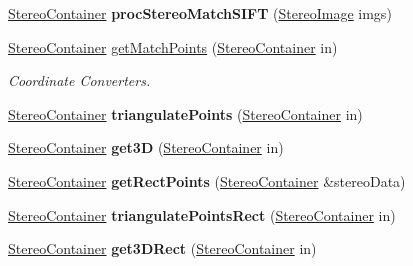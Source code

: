 \begin{DoxyCompactItemize}
\item 
\hyperlink{structStereoContainer}{Stereo\+Container} {\bfseries proc\+Stereo\+Match\+S\+I\+FT} (\hyperlink{classStereoImage}{Stereo\+Image} imgs)\hypertarget{classStereoOps_aaf97002741bcdffbe6514003314cc1ac}{}\label{classStereoOps_aaf97002741bcdffbe6514003314cc1ac}

\item 
\hyperlink{structStereoContainer}{Stereo\+Container} \hyperlink{classStereoOps_acf8969704960f88a3d67bdbe4382041b}{get\+Match\+Points} (\hyperlink{structStereoContainer}{Stereo\+Container} in)\hypertarget{classStereoOps_acf8969704960f88a3d67bdbe4382041b}{}\label{classStereoOps_acf8969704960f88a3d67bdbe4382041b}

\begin{DoxyCompactList}\small\item\em Coordinate Converters. \end{DoxyCompactList}\item 
\hyperlink{structStereoContainer}{Stereo\+Container} {\bfseries triangulate\+Points} (\hyperlink{structStereoContainer}{Stereo\+Container} in)\hypertarget{classStereoOps_a3d039bd6b9a1415a6a7604a5de4f4a8f}{}\label{classStereoOps_a3d039bd6b9a1415a6a7604a5de4f4a8f}

\item 
\hyperlink{structStereoContainer}{Stereo\+Container} {\bfseries get3D} (\hyperlink{structStereoContainer}{Stereo\+Container} in)\hypertarget{classStereoOps_aa4f9754b5db4aa945d6287cfe41ce23b}{}\label{classStereoOps_aa4f9754b5db4aa945d6287cfe41ce23b}

\item 
\hyperlink{structStereoContainer}{Stereo\+Container} {\bfseries get\+Rect\+Points} (\hyperlink{structStereoContainer}{Stereo\+Container} \&stereo\+Data)\hypertarget{classStereoOps_ad3c2195bb918ea873e540c7a462fb4c8}{}\label{classStereoOps_ad3c2195bb918ea873e540c7a462fb4c8}

\item 
\hyperlink{structStereoContainer}{Stereo\+Container} {\bfseries triangulate\+Points\+Rect} (\hyperlink{structStereoContainer}{Stereo\+Container} in)\hypertarget{classStereoOps_a2982cee1539b1db8614f52b2bf09d35b}{}\label{classStereoOps_a2982cee1539b1db8614f52b2bf09d35b}

\item 
\hyperlink{structStereoContainer}{Stereo\+Container} {\bfseries get3\+D\+Rect} (\hyperlink{structStereoContainer}{Stereo\+Container} in)\hypertarget{classStereoOps_a2e3b2cfe6f5613be8f54182c4234af81}{}\label{classStereoOps_a2e3b2cfe6f5613be8f54182c4234af81}


\end{DoxyCompactItemize}
